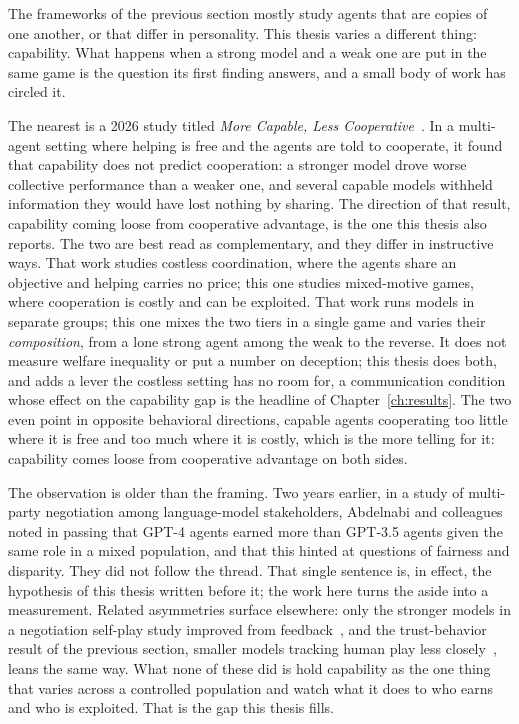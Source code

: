 The frameworks of the previous section mostly study agents that are copies of one another,
or that differ in personality. This thesis varies a different thing: capability. What
happens when a strong model and a weak one are put in the same game is the question its
first finding answers, and a small body of work has circled it.

The nearest is a 2026 study titled \emph{More Capable, Less
Cooperative}~\cite{morecapable2026}. In a multi-agent setting where helping is free
and the agents are told to cooperate, it found that capability does not predict cooperation: a
stronger model drove worse collective performance than a weaker one, and several capable models
withheld information they would have lost nothing by sharing. The direction of that result,
capability coming loose from cooperative advantage, is the one this thesis also reports. The two
are best read as complementary, and they differ in instructive ways. That work studies costless
coordination, where the agents share an objective and helping carries no price; this one studies
mixed-motive games, where cooperation is costly and can be exploited. That work runs models in
separate groups; this one mixes the two tiers in a single game and varies their \emph{composition},
from a lone strong agent among the weak to the reverse. It does not measure welfare inequality or
put a number on deception; this thesis does both, and adds a lever the costless setting has no room
for, a communication condition whose effect on the capability gap is the headline of
Chapter~\ref{ch:results}. The two even point in opposite behavioral directions, capable agents
cooperating too little where it is free and too much where it is costly, which is the more telling
for it: capability comes loose from cooperative advantage on both sides.

The observation is older than the framing. Two years earlier, in a study of multi-party
negotiation among language-model stakeholders, Abdelnabi and colleagues~\cite{abdelnabi2023}
noted in passing that
GPT-4 agents earned more than GPT-3.5 agents given the same role in a mixed population, and
that this hinted at questions of fairness and disparity. They did not follow the thread.
That single sentence is, in effect, the hypothesis of this thesis written before it; the
work here turns the aside into a measurement. Related asymmetries surface elsewhere: only
the stronger models in a negotiation self-play study improved from
feedback~\cite{fuetal2023}, and the trust-behavior result of the previous section, smaller
models tracking human play less closely~\cite{canllmtrust2024}, leans the same way. What
none of these did is hold capability as the one thing that varies across a controlled
population and watch what it does to who earns and who is exploited. That is the gap this
thesis fills.

